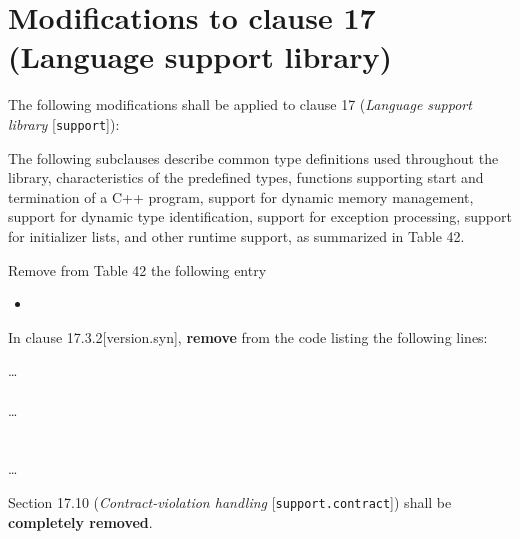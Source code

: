 \section{Modifications to clause 17 (Language support library)}

The following modifications shall be applied to clause 17 (\emph{Language
support library} [\texttt{support}]):

\begin{modification}
The following subclauses describe common type definitions used throughout the
library, characteristics of the predefined types, functions supporting start and
termination of a C++ program, support for dynamic memory management, support
for dynamic type identification, 
support for exception processing, support for initializer lists, and other
runtime support, as summarized in Table 42.  
\end{modification}

\begin{modification}
Remove from Table 42 the following entry

\begin{itemize}

\item
{}

\end{itemize}

\end{modification}

\begin{noted}
In clause 17.3.2[version.syn], \textbf{remove} from the code listing the following lines:

\ldots\\
\\
\ldots\\
\\
\\
\ldots\\
\end{noted}



\begin{removal}
\end{removal}

\begin{removal}
Section 17.10 (\emph{Contract-violation handling} [\texttt{support.contract}])
shall be \textbf{completely removed}.
\end{removal}
